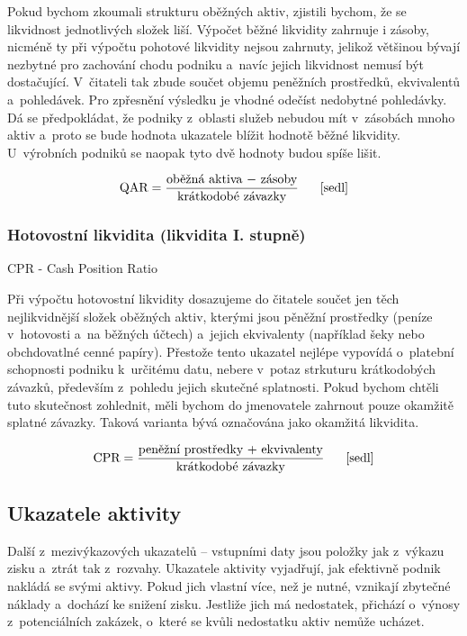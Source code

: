 Pokud bychom zkoumali strukturu oběžných aktiv, zjistili bychom, že se likvidnost jednotlivých složek liší. Výpočet běžné likvidity zahrnuje i zásoby, nicméně ty při výpočtu pohotové likvidity nejsou zahrnuty, jelikož většinou bývají nezbytné pro zachování chodu podniku a~navíc jejich likvidnost nemusí být dostačující.
V~čitateli tak zbude součet objemu peněžních prostředků, ekvivalentů a~pohledávek. Pro zpřesnění výsledku je vhodné odečíst nedobytné pohledávky.
Dá se předpokládat, že podniky z~oblasti služeb nebudou mít v~zásobách mnoho aktiv a~proto se bude hodnota ukazatele blížit hodnotě běžné likvidity. U~výrobních podniků se naopak tyto dvě hodnoty budou spíše lišit.

$$\vz{QAR}{oběžná aktiva $-$ zásoby}{krátkodobé závazky} \scite{sedl}$$

\subsubsection{Hotovostní likvidita (likvidita I. stupně)}
CPR - Cash Position Ratio

Při výpočtu hotovostní likvidity dosazujeme do čitatele součet jen těch nejlikvidnější složek oběžných aktiv, kterými jsou pěněžní prostředky (peníze v~hotovosti a~na běžných účtech) a~jejich ekvivalenty (například šeky nebo obchdovatlné cenné papíry).
Přestože tento ukazatel nejlépe vypovídá o~platební schopnosti podniku k~určitému datu, nebere v~potaz strkuturu krátkodobých závazků, především z~pohledu jejich skutečné splatnosti.\cite{mendelu} Pokud bychom chtěli tuto skutečnost zohlednit, měli bychom do jmenovatele zahrnout pouze okamžitě splatné závazky. Taková varianta bývá označována jako okamžitá likvidita.


$$\vz{CPR}{peněžní prostředky $+$ ekvivalenty}{krátkodobé závazky} \scite{sedl}$$








\subsection{Ukazatele aktivity}
Další z~mezivýkazových ukazatelů -- vstupními daty jsou položky jak z~výkazu zisku a~ztrát tak z~rozvahy. Ukazatele aktivity vyjadřují, jak efektivně podnik nakládá se svými aktivy. Pokud jich vlastní více, než je nutné, vznikají zbytečné náklady a~dochází ke snižení zisku. Jestliže jich má nedostatek, přichází o~výnosy z~potenciálních zakázek, o~které se kvůli nedostatku aktiv nemůže ucházet.

